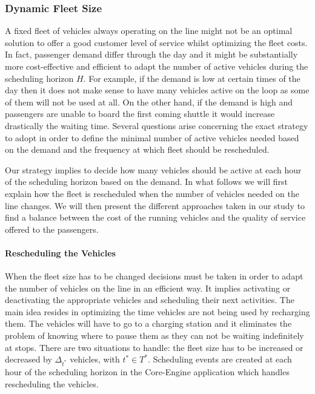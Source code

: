 \documentclass[12pt,a4paper]{article}
\begin{document}
\subsubsection{Dynamic Fleet Size}
A fixed fleet of vehicles always operating on the line might not be an optimal solution to offer a good customer level of service whilst optimizing the fleet costs. In fact, passenger demand differ through the day and it might be substantially more cost-effective and efficient to adapt the number of active vehicles during the scheduling horizon $H$. For example, if the demand is low at certain times of the day then it does not make sense to have many vehicles active on the loop as some of them will not be used at all. On the other hand, if the demand is high and passengers are unable to board the first coming shuttle it would increase drastically the waiting time. Several questions arise concerning the exact strategy to adopt in order to define the minimal number of active vehicles needed based on the demand and the frequency at which fleet should be rescheduled. 

Our strategy implies to decide how many vehicles should be active at each hour of the scheduling horizon based on the demand. In what follows we will first explain how the fleet is rescheduled when the number of vehicles needed on the line changes. We will then present the different approaches taken in our study to find a balance between the cost of the running vehicles and the quality of service offered to the passengers. 

\paragraph{Rescheduling the Vehicles} When the fleet size has to be changed decisions must be taken in order to adapt the number of vehicles on the line in an efficient way. It implies activating or deactivating the appropriate vehicles and scheduling their next activities. The main idea resides in optimizing the time vehicles are not being used by recharging them. The vehicles will have to go to a charging station and it eliminates the problem of knowing where to pause them as they can not be waiting indefinitely at stops. There are two situations to handle: the fleet size has to be increased or decreased by $\Delta_{t^{*}}$ vehicles, with $t^{*} \in T^{*}$. Scheduling events are created at each hour of the scheduling horizon in the Core-Engine application which handles rescheduling the vehicles.
\end{document}
